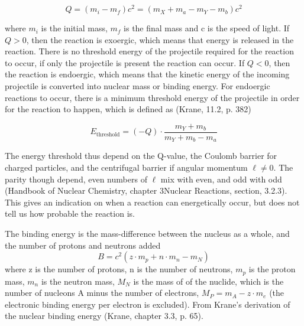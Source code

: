 \documentclass[a4paper,11pt,twoside]{book}
\begin{document}
\begin{equation} \label{eq:Q_value}
    Q = (m_i - m_f)c^2 = (m_X + m_a - m_Y - m_b)c^2
\end{equation}

\noindent where $m_i$ is the initial mass, $m_f$ is the final mass and c is the speed of light. If $Q>0$, then the reaction is exoergic, which means that energy is released in the reaction. There is no threshold energy of the projectile required for the reaction to occur, if only the projectile is present the reaction can occur. If $Q<0$, then the reaction is endoergic, which means that the kinetic energy of the incoming projectile is converted into nuclear mass or binding energy. For endoergic reactions to occur, there is a minimum threshold energy of the projectile in order for the reaction to happen, which is defined as (Krane, 11.2, p. 382)

\begin{equation} \label{eq:reaction_threshold}
    E_\text{threshold} = (-Q) \cdot \frac{m_Y +m_b}{m_Y + m_b -m_a}
\end{equation}


\noindent The energy threshold thus depend on the Q-value, the Coulomb barrier for charged particles, and the centrifugal barrier if angular momentum $\ell\neq 0$. The parity though depend, even numbers of $\ell$ mix with even, and odd with odd (Handbook of Nuclear Chemistry, chapter 3Nuclear Reactions, section, 3.2.3). This gives an indication on when a reaction can energetically occur, but does not tell us how probable the reaction is. %


The binding energy is the mass-difference between the nucleus as a whole, and the number of protons and neutrons added
\begin{equation} \label{eq:Binding_energy1}
    B = c^2(z\cdot m_p + n \cdot m_n - m_N)
\end{equation}
\noindent where z is the number of protons, n is the number of neutrons, $m_p$ is the proton mass, $m_n$ is the neutron mass, $M_N$ is the mass of of the nuclide, which is the number of nucleons A minus the number of electrons, $M_P = m_A - z\cdot m_e$ (the electronic binding energy per electron is excluded). From Krane's derivation of the nuclear binding energy (Krane, chapter 3.3, p. 65). 
\end{document}
